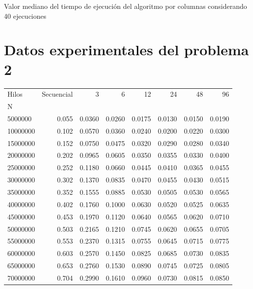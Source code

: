 \documentclass{report}
\begin{document}
\begin{appendices}
\begin{table}[H]
\caption{Valor mediano del tiempo de ejecución del algoritmo por columnas
  considerando 40 ejecuciones}
\label{table:squares-alg1-data}
\end{table}

\chapter{Datos experimentales del problema 2}

\begin{table}[H]
\begin{tabular}{lrrrrrrr}
\toprule
Hilos &  Secuencial &       3 &       6 &      12 &      24 &      48 &      96 \\
N         &             &         &         &         &         &         &         \\
\midrule
5000000   &       0.055 &  0.0360 &  0.0260 &  0.0175 &  0.0130 &  0.0150 &  0.0190 \\
10000000  &       0.102 &  0.0570 &  0.0360 &  0.0240 &  0.0200 &  0.0220 &  0.0300 \\
15000000  &       0.152 &  0.0750 &  0.0475 &  0.0320 &  0.0290 &  0.0280 &  0.0340 \\
20000000  &       0.202 &  0.0965 &  0.0605 &  0.0350 &  0.0355 &  0.0330 &  0.0400 \\
25000000  &       0.252 &  0.1180 &  0.0660 &  0.0445 &  0.0410 &  0.0365 &  0.0455 \\
30000000  &       0.302 &  0.1370 &  0.0835 &  0.0470 &  0.0455 &  0.0430 &  0.0515 \\
35000000  &       0.352 &  0.1555 &  0.0885 &  0.0530 &  0.0505 &  0.0530 &  0.0565 \\
40000000  &       0.402 &  0.1760 &  0.1000 &  0.0630 &  0.0520 &  0.0525 &  0.0635 \\
45000000  &       0.453 &  0.1970 &  0.1120 &  0.0640 &  0.0565 &  0.0620 &  0.0710 \\
50000000  &       0.503 &  0.2165 &  0.1210 &  0.0745 &  0.0620 &  0.0655 &  0.0705 \\
55000000  &       0.553 &  0.2370 &  0.1315 &  0.0755 &  0.0645 &  0.0715 &  0.0775 \\
60000000  &       0.603 &  0.2570 &  0.1450 &  0.0825 &  0.0685 &  0.0730 &  0.0835 \\
65000000  &       0.653 &  0.2760 &  0.1530 &  0.0890 &  0.0745 &  0.0725 &  0.0805 \\
70000000  &       0.704 &  0.2990 &  0.1610 &  0.0960 &  0.0730 &  0.0815 &  0.0850 \\

\end{tabular}
\end{table}
\end{appendices}
\end{document}
